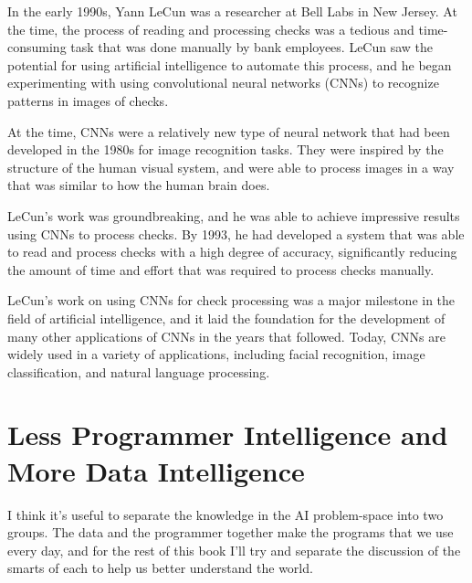 In the early 1990s, Yann LeCun was a researcher at Bell Labs in New Jersey. At the time, the process of reading and processing checks was a tedious and time-consuming task that was done manually by bank employees. LeCun saw the potential for using artificial intelligence to automate this process, and he began experimenting with using convolutional neural networks (CNNs) to recognize patterns in images of checks.

At the time, CNNs were a relatively new type of neural network that had been developed in the 1980s for image recognition tasks. They were inspired by the structure of the human visual system, and were able to process images in a way that was similar to how the human brain does.

LeCun’s work was groundbreaking, and he was able to achieve impressive results using CNNs to process checks. By 1993, he had developed a system that was able to read and process checks with a high degree of accuracy, significantly reducing the amount of time and effort that was required to process checks manually.

LeCun's work on using CNNs for check processing was a major milestone in the field of artificial intelligence, and it laid the foundation for the development of many other applications of CNNs in the years that followed. Today, CNNs are widely used in a variety of applications, including facial recognition, image classification, and natural language processing.

\section{Less Programmer Intelligence and More Data Intelligence}

I think it’s useful to separate the knowledge in the AI problem-space into two groups. The data and the programmer together make the programs that we use every day, and for the rest of this book I’ll try and separate the discussion of the smarts of each to help us better understand the world.

